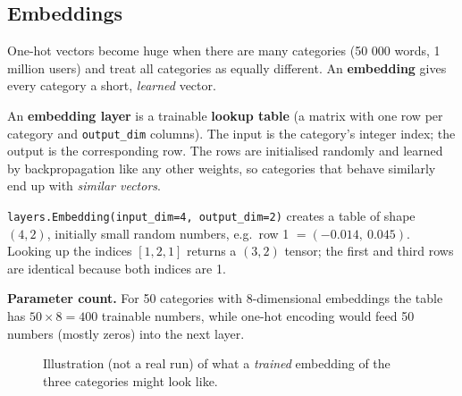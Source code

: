 \subsection{Embeddings}

One-hot vectors become huge when there are many categories (50 000 words, 1 million users) and treat all categories as equally different. An \textbf{embedding} gives every category a short, \emph{learned} vector.

\begin{definition}[: Embedding]
An \textbf{embedding layer} is a trainable \textbf{lookup table} (a matrix with one row per category and \texttt{output\_dim} columns). The input is the category's integer index; the output is the corresponding row. The rows are initialised randomly and learned by backpropagation like any other weights, so categories that behave similarly end up with \emph{similar vectors}.
\end{definition}

\begin{example}
\texttt{layers.Embedding(input\_dim=4, output\_dim=2)} creates a table of shape $(4,2)$, initially small random numbers, e.g.\ row 1 $=(-0.014,\ 0.045)$. Looking up the indices $[1,2,1]$ returns a $(3,2)$ tensor; the first and third rows are identical because both indices are 1.

\medskip
\textbf{Parameter count.} For 50 categories with 8-dimensional embeddings the table has $50\times8=400$ trainable numbers, while one-hot encoding would feed 50 numbers (mostly zeros) into the next layer.
\end{example}

\begin{figure}[!htbp]
\centering
{}
\caption{Illustration (not a real run) of what a \emph{trained} embedding of the three categories might look like.}\label{fig:embedding}
\end{figure}

